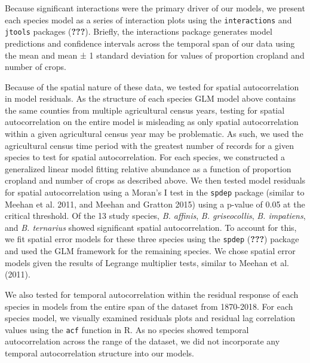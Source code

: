 \documentclass[11pt,]{article}
\begin{document}
Because significant interactions were the primary driver of our models,
we present each species model as a series of interaction plots using the
\texttt{interactions} and \texttt{jtools} packages ({\textbf{???}}).
Briefly, the interactions package generates model predictions and
confidence intervals across the temporal span of our data using the mean
and mean ± 1 standard deviation for values of proportion cropland and
number of crops.

Because of the spatial nature of these data, we tested for spatial
autocorrelation in model residuals. As the structure of each species GLM
model above contains the same counties from multiple agricultural census
years, testing for spatial autocorrelation on the entire model is
misleading as only spatial autocorrelation within a given agricultural
census year may be problematic. As such, we used the agricultural census
time period with the greatest number of records for a given species to
test for spatial autocorrelation. For each species, we constructed a
generalized linear model fitting relative abundance as a function of
proportion cropland and number of crops as described above. We then
tested model residuals for spatial autocorrelation using a Moran's I
test in the \texttt{spdep} package (similar to Meehan et al. 2011, and
Meehan and Gratton 2015) using a p-value of 0.05 at the critical
threshold. Of the 13 study species, \emph{B. affinis}, \emph{B.
griseocollis}, \emph{B. impatiens}, and \emph{B. ternarius} showed
significant spatial autocorrelation. To account for this, we fit spatial
error models for these three species using the \texttt{spdep}
({\textbf{???}}) package and used the GLM framework for the remaining
species. We chose spatial error models given the results of Legrange
multiplier tests, similar to Meehan et al. (2011).

We also tested for temporal autocorrelation within the residual response
of each species in models from the entire span of the dataset from
1870-2018. For each species model, we visually examined residuals plots
and residual lag correlation values using the \texttt{acf} function in
R. As no species showed temporal autocorrelation across the range of the
dataset, we did not incorporate any temporal autocorrelation structure
into our models.
\end{document}
